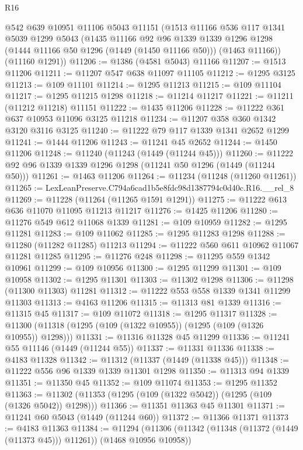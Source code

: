 \begin{lexlean}{R16}
\begin{coremodule}
    @542
    @639
    @10951
    @11106
    @5043
    @11151
    (@1513
      @11166
      @536
      @117
      @1341
      @5039
      @1299
      @5043
      (@1435
        @11166
        @92
        @96
        @1339
        @1339
        @1296
        @1298
        (@1444 @11166 @50 @1296 (@1449 (@1450 @11166 @50)))
        (@1463 @11166))
      (@11160 @1291))
@11206 := @1386 (@4581 @5043) @11166
@11207 := @1513 @11206
@11211 := @11207 @547 @638 @11097 @11105
@11212 := @1295 @3125
@11213 := @109 @11101
@11214 := @1295 @11213
@11215 := @109 @11104
@11217 := @1295 @11215 @1298
@11218 := @11214 @11217
@11221 := @11211 (@11212 @11218) @11151
@11222 := @1435 @11206
@11228 := @11222 @361 @637 @10953 @11096 @3125 @11218
@11234 := @11207 @358 @360 @1342 @3120 @3116 @3125
@11240 := @11222 @79 @117 @1339 @1341 @2652 @1299
@11241 := @1444 @11206
@11243 := @11241 @45 @2652
@11244 := @1450 @11206
@11248 := @11240 (@11243 (@1449 (@11244 @45)))
@11260 := @11222 @92 @96 @1339 @1339 @1296 @1298 (@11241 @50 @1296 (@1449 (@11244 @50)))
@11261 := @1463 @11206
@11264 := @11234 (@11248 (@11260 @11261))
@11265 := LexLeanPreserve.C794a6cad1b5e8fdc98d1387794c0d40c.R16.__rel_8
@11269 := @11228 (@11264 (@11265 @1591 @1291))
@11275 := @11222 @613 @636 @11070 @11095 @11213 @11217
@11276 := @1425 @11206
@11280 := @11276 @549 @612 @11068 @1339
@11281 := @109 @10959
@11282 := @1295 @11281
@11283 := @109 @11062
@11285 := @1295 @11283 @1298
@11288 := @11280 (@11282 @11285) @11213
@11294 := @11222 @560 @611 @10962 @11067 @11281 @11285
@11295 := @11276 @248
@11298 := @11295 @559 @1342 @10961
@11299 := @109 @10956
@11300 := @1295 @11299
@11301 := @109 @10958
@11302 := @1295 @11301
@11303 := @11302 @1298
@11306 := @11298 (@11300 @11303) @11281
@11312 := @11222 @553 @558 @1339 @1341 @11299 @11303
@11313 := @4163 @11206
@11315 := @11313 @81 @1339
@11316 := @11315 @45
@11317 := @109 @11072
@11318 := @1295 @11317
@11328 := @11300 (@11318 (@1295 (@109 (@1322 @10955)) (@1295 (@109 (@1326 @10955)) @1298)))
@11331 := @11316 @11328 @45 @11299
@11336 := @11241 @55 @11146 (@1449 (@11244 @55))
@11337 := @11331 @11336
@11338 := @4183 @11328
@11342 := @11312 (@11337 (@1449 (@11338 @45)))
@11348 := @11222 @556 @96 @1339 @1339 @11301 @1298
@11350 := @11313 @94 @1339
@11351 := @11350 @45
@11352 := @109 @11074
@11353 := @1295 @11352
@11363 := @11302 (@11353 (@1295 (@109 (@1322 @5042)) (@1295 (@109 (@1326 @5042)) @1298)))
@11366 := @11351 @11363 @45 @11301
@11371 := @11241 @60 @5043 (@1449 (@11244 @60))
@11372 := @11366 @11371
@11373 := @4183 @11363
@11384 := @11294
    (@11306 (@11342 (@11348 (@11372 (@1449 (@11373 @45))) @11261)) (@1468 @10956 @10958))

\end{coremodule}
\end{lexlean}
